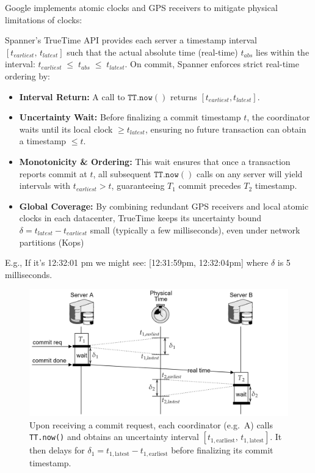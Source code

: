 \newpage 
\noindent
Google implements atomic clocks and GPS receivers to mitigate physical limitations of clocks:
\begin{Def}

    Spanner's TrueTime API provides each server a timestamp interval
    \([t_{\mathit{earliest}},\,t_{\mathit{latest}}]\) such that the actual absolute time (real-time) \(t_{\mathit{abs}}\) lies within the interval:
    \(
    t_{\mathit{earliest}} \;\le\; t_{\mathit{abs}}\;\le\; t_{\mathit{latest}}
    \).
    On commit, Spanner enforces strict real-time ordering by:
    
    \begin{itemize}
      \item \textbf{Interval Return:} A call to \(\mathtt{TT.now()}\) returns \([t_{\mathit{earliest}},t_{\mathit{latest}}]\).
      \item \textbf{Uncertainty Wait:} Before finalizing a commit timestamp \(t\), the coordinator waits until its local clock \(\ge t_{\mathit{latest}}\), ensuring no future transaction can obtain a timestamp \(\le t\).
      \item \textbf{Monotonicity \& Ordering:} This wait ensures that once a transaction reports commit at \(t\), all subsequent \(\mathtt{TT.now()}\) calls on any server will yield intervals with \(t_{\mathit{earliest}}>t\), guaranteeing \(T_1\) commit precedes \(T_2\) timestamp.
      \item \textbf{Global Coverage:} By combining redundant GPS receivers and local atomic clocks in each datacenter, TrueTime keeps its uncertainty bound \(\delta = t_{\mathit{latest}} - t_{\mathit{earliest}}\) small (typically a few milliseconds), even under network partitions (Kops)
    \end{itemize}

    \noindent
    E.g., If it's 12:32:01 pm we might see: [12:31:59pm, 12:32:04pm] where $\delta$ is 5 milliseconds.
    \end{Def}

    \begin{figure}[ht!]

        \centering
        \includegraphics[width=\textwidth]{Sections/span/tt_2.png}
        \caption{Upon receiving a commit request, each coordinator (e.g.\ A) calls \texttt{TT.now()} and obtains an uncertainty interval \([t_{1,\mathrm{earliest}},\,t_{1,\mathrm{latest}}]\). It then delays for \(\delta_1 = t_{1,\mathrm{latest}} - t_{1,\mathrm{earliest}}\) before finalizing its commit timestamp.}
    \end{figure}

